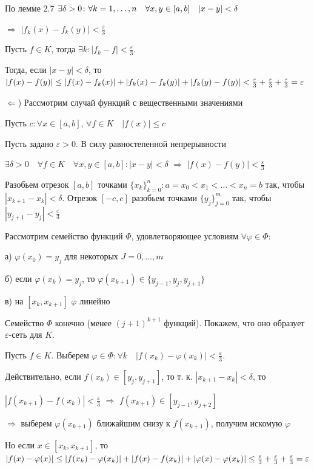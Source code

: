 \documentclass[a4paper]{report}
\newcommand*{\hm}[1]{#1\nobreak\discretionary{}%
            {\hbox{$\mathsurround=0pt #1$}}{}}
\begin{document}
По лемме 2.7 $\exists\delta>0\colon\forall k\hm=1,\ldots,n\quad\forall x,y\in[a,b]\quad|x-y|<\delta$

$\Rightarrow$
$|f_k(x)-f_k(y)|<\frac\varepsilon3$

Пусть $f\in K$, тогда $\exists k\colon|f_k-f|<\frac\varepsilon3$.

Тогда, если $|x-y|<\delta$, то $|f(x)\hm-f(y)|\le|f(x)-f_k(x)|+|f_k(x)-f_k(y)|\hm+|f_k(y)-f(y)|<\frac\varepsilon3+
\frac\varepsilon3+\frac\varepsilon3=\varepsilon$

$\Leftarrow$) Рассмотрим случай функций с вещественными значениями

 \noindent Пусть $c\colon\forall x\in[a,b]$, $\forall f\in K\quad |f(x)|\le c$

 Пусть задано $\varepsilon>0$. В силу равностепенной непрерывности

 $\exists\delta>0\quad\forall f\in K\quad
\forall x,y\in[a,b]\colon|x-y|<\delta$ $\Rightarrow$ $|f(x)-f(y)|<\frac\varepsilon3$


Разобьем отрезок $[a,b]$ точками $\{x_k\}_{k=0}^n\colon a=x_0<x_1<\ldots<x_n=b$ так, чтобы $|x_{k+1}-x_k|<\delta$. Отрезок
$[-c,c]$ разобьем точками $\{y_j\}_{j=0}^m$ так, чтобы $|y_{j+1}-y_j|<\frac\varepsilon3$

Рассмотрим семейство функций $\Phi$, удовлетворяющее условиям $\forall\varphi\in\Phi$:

а) $\varphi(x_0)=y_j$ для некоторых $J=0,\ldots,m$

б) если $\varphi(x_k)=y_j$, то $\varphi(x_{k+1})\in\{y_{j-1},y_j,y_{j+1}\}$

в) на $[x_k,x_{k+1}]$ $\varphi$ линейно

Семейство $\Phi$ конечно (менее $(j+1)^{k+1}$ функций). Покажем, что оно образует $\varepsilon$-сеть для $K$.

Пусть $f\in K$. Выберем $\varphi\in\Phi\colon\forall k\quad|f(x_k)-\varphi(x_k)|<\frac\varepsilon3$.

Действительно, если $f(x_k)\in[y_j,y_{j+1}]$, то т. к. $|x_{k+1}-x_k|<\delta$, то

$|f(x_{k+1})-f(x_k)|<\frac\varepsilon3$ $\Rightarrow$ $f(x_{k+1})\in[y_{j-1},y_{j+2}]$

$\Rightarrow$ выберем $\varphi(x_{k+1})$ ближайшим снизу к $f(x_{k+1})$, получим искомую $\varphi$

Но если $x\in[x_k,x_{k+1}]$, то $|f(x)-\varphi(x)|\le|f(x_k)-\varphi(x_k)|+|f(x)-f(x_k)|\hm+|\varphi(x)-\varphi(x_k)|\le
\frac\varepsilon3+\frac\varepsilon3+\frac\varepsilon3=\varepsilon$
\end{document}
